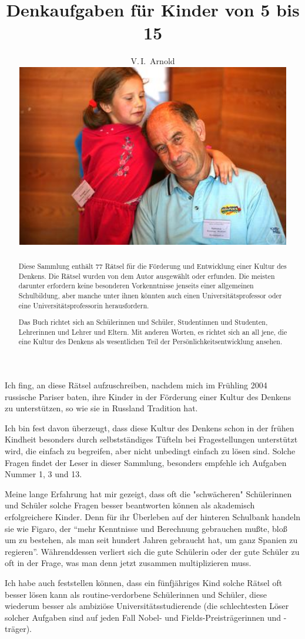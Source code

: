 \documentclass[12pt]{article} %
\title{ Denkaufgaben für Kinder von 5 bis 15}
\author{V.\,I.~Arnold
\vspace*{2cm}\\ 
\includegraphics[width=12cm]{photo-arnold_small}
}
\date{}
\begin{document}
\def\eps{\varepsilon}
\maketitle
\thispagestyle{empty}

\newpage 
\setcounter{page}{1}
\begin{abstract}

Diese Sammlung enthält 77 Rätsel für die Förderung und Entwicklung einer Kultur des Denkens. Die Rätsel wurden von dem Autor ausgewählt oder erfunden. Die meisten darunter erfordern keine besonderen Vorkenntnisse jenseits einer allgemeinen Schulbildung, aber manche unter ihnen könnten auch einen Universitätsprofessor oder eine Uni\-ver\-si\-täts\-pro\-fes\-sorin herausfordern. 

Das Buch richtet sich an Schülerinnen und Schüler, Studentinnen und Studenten, Lehrerinnen und Lehrer und Eltern. Mit anderen Worten, es richtet sich an all jene, die eine Kultur des Denkens als wesentlichen Teil der Persönlichkeitsentwicklung ansehen.

\end{abstract}

\newpage

Ich fing, an diese Rätsel aufzuschreiben, nachdem mich im Frühling 2004 russische Pariser baten, ihre Kinder in der Förderung einer Kultur des Denkens zu unterstützen, so wie sie in Russland Tradition hat.

Ich bin fest davon überzeugt, dass diese Kultur des Denkens schon in der frühen Kindheit besonders durch selbstständiges Tüfteln bei Fragestellungen unterstützt wird, die einfach zu begreifen, aber nicht unbedingt einfach zu lösen sind. Solche Fragen findet der Leser in dieser Sammlung, besonders empfehle ich Aufgaben Nummer 1, 3 und 13.

Meine lange Erfahrung hat mir gezeigt, dass oft die "schwächeren" Schü\-le\-rin\-nen und Schüler solche Fragen besser beantworten können als akademisch erfolgreichere Kinder. Denn für ihr Überleben auf der hinteren Schulbank handeln sie wie Figaro, der “mehr Kenntnisse und Berechnung gebrauchen mußte, bloß um zu bestehen, als man seit hundert Jahren gebraucht hat, um ganz Spanien zu regieren”. Währenddessen verliert sich die gute Schülerin oder der gute Schüler zu oft in der Frage, was man denn jetzt zusammen multiplizieren muss. 

Ich habe auch feststellen können, dass ein fünfjähriges Kind solche Rätsel oft besser lösen kann als routine-verdorbene Schülerinnen und Schüler, diese wiederum besser als ambiziöse Universitätsstudierende (die schlechtesten Löser solcher Aufgaben sind auf jeden Fall Nobel- und Fields-Preisträgerinnen und -träger).
\end{document}
